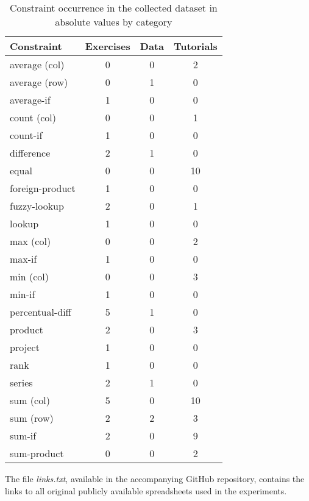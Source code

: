 {\begin{table}[htb]
  \centering
  \caption{Constraint occurrence in the collected dataset in absolute values by category}
  \label{tab:constraint_by_category}
  \begin{tabular}{l | c c c }
    \textbf{Constraint} & \textbf{Exercises} & \textbf{Data} & \textbf{Tutorials}  \\\hline
    average (col) & 0 & 0 & 2 \\
    average (row) & 0 & 1 & 0 \\
    average-if    & 1 & 0 & 0 \\
    count (col) & 0 & 0 & 1 \\
    count-if & 1 & 0 & 0 \\
    difference & 2 & 1 & 0 \\
    equal & 0 & 0 & 10 \\
    foreign-product & 1 & 0 & 0 \\
    fuzzy-lookup & 2 & 0 & 1 \\
    lookup & 1 & 0 & 0 \\
    max (col) & 0 & 0 & 2 \\
    max-if & 1 & 0 & 0 \\
    min (col) & 0 & 0 & 3 \\
    min-if & 1 & 0 & 0 \\
    percentual-diff & 5 & 1 & 0 \\
    product & 2 & 0 & 3 \\
    project & 1 & 0 & 0 \\
    rank & 1 & 0 & 0 \\
    series & 2 & 1 & 0 \\
    sum (col) & 5 & 0 & 10 \\
    sum (row) & 2 & 2 & 3 \\
    sum-if & 2 & 0 & 9 \\
    sum-product & 0 & 0 & 2 \\
  \end{tabular}
\end{table}

The file \textit{links.txt}, available in the accompanying GitHub repository, contains the links to all original publicly available spreadsheets used in the experiments.
}



\cleardoublepage

